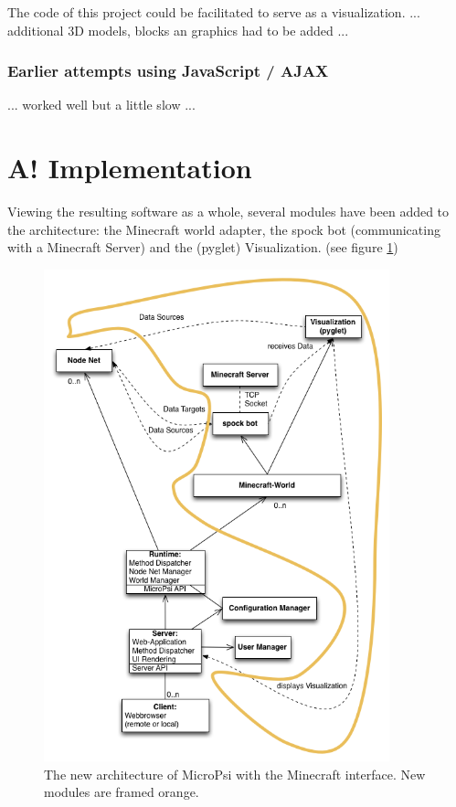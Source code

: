 The code of this project could be facilitated to serve as a visualization.
... additional 3D models, blocks an graphics had to be added ...

\subsubsection{Earlier attempts using JavaScript / AJAX}
... worked well but a little slow ...

\section{A! Implementation}

Viewing the resulting software as a whole, several modules have been added to the architecture: the Minecraft world adapter, the spock bot (communicating with a Minecraft Server) and the (pyglet) Visualization. (see figure \ref{uml_mc})

\begin{figure}[h]
  \centering
    \includegraphics[width=10cm]{graphics/UML_MicroPsi_mit_spock_und_rahmen}
  \caption{The new architecture of MicroPsi with the Minecraft interface. New modules are framed orange.}
  \label{uml_mc}
\end{figure}

